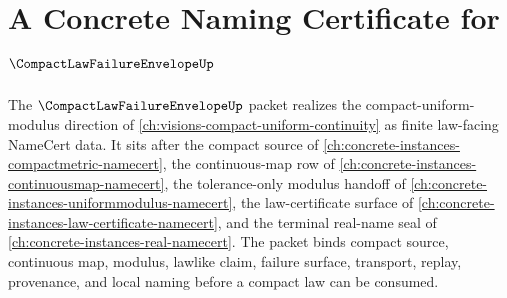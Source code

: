 \chapter{A Concrete Naming Certificate for $\CompactLawFailureEnvelopeUp$}
\label{ch:concrete-instances-compact-law-failure-envelope-namecert}

The $\CompactLawFailureEnvelopeUp$ packet realizes the compact-uniform-modulus direction of \autoref{ch:visions-compact-uniform-continuity} as finite law-facing NameCert data. It sits after the compact source of \autoref{ch:concrete-instances-compactmetric-namecert}, the continuous-map row of \autoref{ch:concrete-instances-continuousmap-namecert}, the tolerance-only modulus handoff of \autoref{ch:concrete-instances-uniformmodulus-namecert}, the law-certificate surface of \autoref{ch:concrete-instances-law-certificate-namecert}, and the terminal real-name seal of \autoref{ch:concrete-instances-real-namecert}. The packet binds compact source, continuous map, modulus, lawlike claim, failure surface, transport, replay, provenance, and local naming before a compact law can be consumed.

